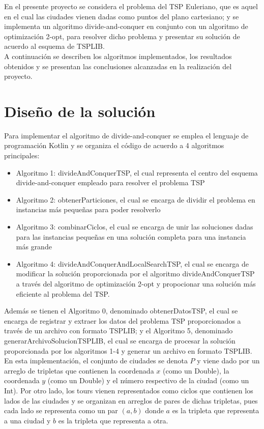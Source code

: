 \documentclass[titlepage]{article}
\begin{document}
	En el presente proyecto se considera el problema del TSP Euleriano, que es aquel en el cual las ciudades vienen dadas como puntos del plano cartesiano; y se implementa un algoritmo divide-and-conquer en conjunto con un algoritmo de optimizaci\'on 2-opt, para resolver dicho problema y presentar su soluci\'on de acuerdo al esquema de TSPLIB.\\
	
	A continuaci\'on se describen los algoritmos implementados, los resultados obtenidos y se presentan las conclusiones alcanzadas en la realizaci\'on del proyecto.
	
	\section{Diseño de la soluci\'on}
	
	Para implementar el algoritmo de divide-and-conquer se emplea el lenguaje de programaci\'on Kotlin y se organiza el c\'odigo de acuerdo a 4 algoritmos principales:
	\begin{itemize}
		\item Algoritmo 1:  divideAndConquerTSP, el cual representa el centro del esquema divide-and-conquer empleado para resolver el problema TSP
		\item Algoritmo 2:  obtenerParticiones, el cual se encarga de dividir el problema en instancias m\'as pequeñas para poder resolverlo
		\item Algoritmo 3: combinarCiclos, el cual se encarga de unir las soluciones dadas para las instancias pequeñas en una solución completa para una instancia más grande
		\item Algoritmo 4:  divideAndConquerAndLocalSearchTSP, el cual se encarga de modificar la soluci\'on proporcionada por el algoritmo divideAndConquerTSP a trav\'es del algoritmo de optimizaci\'on 2-opt y propocionar una soluci\'on m\'as eficiente al problema del TSP.
	\end{itemize}
	
	Adem\'as se tienen el Algoritmo 0, denominado obtenerDatosTSP, el cual se encarga de registrar y extraer los datos del problema TSP proporcionados a trav\'es de un archivo con formato TSPLIB; y el Algoritmo 5, denominado generarArchivoSolucionTSPLIB, el cual se encarga de procesar la soluci\'on proporcionada por los algoritmos 1-4 y generar un archivo en formato TSPLIB.\\  
	
	En esta implementaci\'on, el conjunto de ciudades se denota $P$ y viene dado por un arreglo de tripletas que contienen la coordenada $x$ (como un Double), la coordenada $y$ (como un Double) y el n\'umero respectivo de la ciudad (como un Int). Por otro lado, los tours vienen representados como ciclos que contienen los lados de las ciudades y se organizan en arreglos de pares de dichas tripletas, pues cada lado se representa como un par $(a,b)$ donde $a$ es la tripleta que representa a una ciudad y $b$ es la tripleta que representa a otra.\\
	
\end{document}
